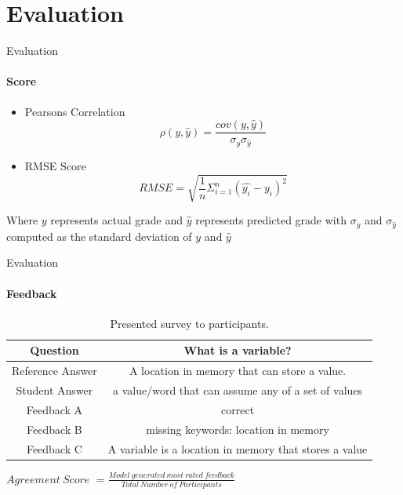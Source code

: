 \documentclass[aspectratio=169]{beamer}
\begin{document}
\section{Evaluation}
\begin{frame}{Evaluation}
	\framesubtitle{Score}
	\begin{itemize}
		\item Pearsons Correlation
		\begin{equation}
		\label{equation:pearson correlation}
		\rho(y,\hat{y}) = \frac{cov(y,\hat{y})}{\sigma_y \sigma_{\hat{y}}}
		\end{equation}
		\item RMSE Score
		\begin{equation}
		\label{equation:Root mean square error}
		RMSE = \sqrt{\frac{1}{n}\Sigma_{i=1}^n(\hat{y_i} - y_i)^2}
		\end{equation}
	\end{itemize}
Where $y$ represents actual grade and $\hat{y}$ represents predicted grade with $\sigma_y$ and $\sigma_{\hat{y}}$ computed as the standard deviation of $y$ and $\hat{y}$
\end{frame}
\begin{frame}{Evaluation}
\framesubtitle{Feedback}
\begin{table}
	\begin{center}
		\begin{tabular}{ |c|c| }
			\hline
			Question & What is a variable?  
			\\ \hline 
			Reference Answer & A location in memory that can store a value.
			\\ \hline
			Student Answer & a value/word that can assume any of a set of values
			\\ \hline
			Feedback A & correct
			\\ \hline
			Feedback B & missing keywords: location in memory
			\\ \hline
			Feedback C & A variable is a location in memory that stores a value
			\\ \hline
		\end{tabular}
		\caption{Presented survey to participants.}
		\label{table:language models}
	\end{center}
\end{table}
\centering
$Agreement\ Score$ $= \frac{Model\ generated\ most\ rated\ feedback}{Total\ Number\ of\ Participants}$
\end{frame}
\end{document}
